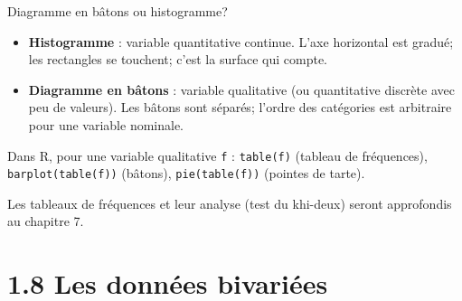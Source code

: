 \documentclass{BeamerTemplate}
\begin{document}
\begin{frame}[t]{Diagramme en bâtons ou histogramme?}
  \begin{itemize}\itemsep 2mm
    \item \textbf{Histogramme} : variable \alert{quantitative} continue. L'axe
      horizontal est gradué; les rectangles se touchent; c'est la
      \alert{surface} qui compte.
    \item \textbf{Diagramme en bâtons} : variable \alert{qualitative} (ou
      quantitative discrète avec peu de valeurs). Les bâtons sont séparés;
      l'ordre des catégories est arbitraire pour une variable nominale.
  \end{itemize}

  \medskip

  Dans R, pour une variable qualitative \texttt{f} :
  \texttt{table(f)} (tableau de fréquences), \texttt{barplot(table(f))}
  (bâtons), \texttt{pie(table(f))} (pointes de tarte).

  \medskip
  Les tableaux de fréquences et leur analyse (test du khi-deux) seront
  approfondis au chapitre 7.

\end{frame}

\section[Données bivariées]{1.8 Les données bivariées}
\end{document}
